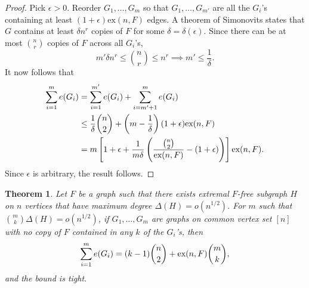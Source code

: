 \documentclass[12pt]{report}
\newtheorem{theorem}{Theorem}[chapter]
\begin{document}
\begin{proof}
  Pick $\epsilon > 0$. Reorder $G_1, \ldots, G_m$ so that $G_1, \ldots, G_{m'}$ are all the $G_i$'s
  containing at least $(1 + \epsilon)\text{ex}(n, F)$ edges. A theorem of Simonovits states that $G$
  contains at least $\delta n^r$ copies of $F$ for some $\delta = \delta(\epsilon)$. Since there can
  be at most $\binom{n}{r}$ copies of $F$ across all $G_i$'s, 
  \[
    m'\delta n^{r} \leq \binom{n}{r} \leq n^r \implies m' \leq \frac{1}{\delta}.
  \]
  It now follows that
  \begin{align*}
    \sum_{i = 1}^m e(G_i) 
    &= \sum_{i = 1}^{m'} e(G_i) + \sum_{i = m' + 1}^m e(G_i) \\
    &\leq \frac{1}{\delta}\binom{n}{2} + \left(m - \frac{1}{\delta}\right)(1 + \epsilon)\text{ex}(n, F) \\
    &= m\left[1 + \epsilon + \frac{1}{m\delta}\left(\frac{\binom{n}{2}}{\textnormal{ex}(n, F)} - (1 + \epsilon)\right)\right]\textnormal{ex}(n, F).
  \end{align*}
  Since $\epsilon$ is arbitrary, the result follows.
\end{proof}

\begin{theorem}
  Let $F$ be a graph such that there exists extremal $F$-free subgraph $H$ on $n$ vertices that have
  maximum degree $\Delta(H) = o(n^{1/2})$. For $m$ such that $\binom{m}{k}\Delta(H) = o(n^{1/2})$,
  if $G_1, \ldots, G_m$ are graphs on common vertex set $[n]$ with no copy of $F$ contained in any
  $k$ of the $G_i$'s, then
  \[
    \sum_{i = 1}^m e(G_i) = (k - 1)\binom{n}{2} + \textnormal{ex}(n, F)\binom{m}{k},
  \]
  and the bound is tight.
\end{theorem}
\end{document}
